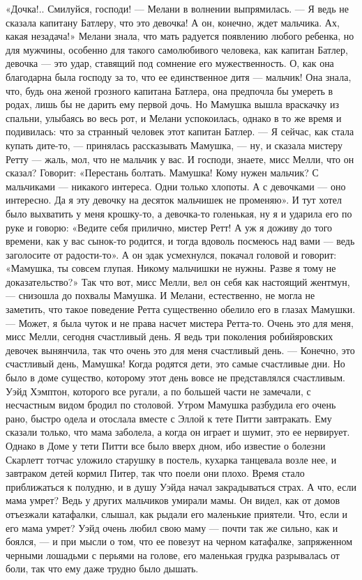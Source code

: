 «Дочка!.. Смилуйся, господи! — Мелани в волнении выпрямилась. — Я ведь не сказала капитану Батлеру, что это девочка! А он, конечно, ждет мальчика. Ах, какая незадача!» Мелани знала, что мать радуется появлению любого ребенка, но для мужчины, особенно для такого самолюбивого человека, как капитан Батлер, девочка — это удар, ставящий под сомнение его мужественность. О, как она благодарна была господу за то, что ее единственное дитя — мальчик! Она знала, что, будь она женой грозного капитана Батлера, она предпочла бы умереть в родах, лишь бы не дарить ему первой дочь.
Но Мамушка вышла враскачку из спальни, улыбаясь во весь рот, и Мелани успокоилась, однако в то же время и подивилась: что за странный человек этот капитан Батлер.
— Я сейчас, как стала купать дите-то, — принялась рассказывать Мамушка, — ну, и сказала мистеру Ретту — жаль, мол, что не мальчик у вас. И господи, знаете, мисс Мелли, что он сказал? Говорит: «Перестань болтать. Мамушка! Кому нужен мальчик? С мальчиками — никакого интереса. Одни только хлопоты. А с девочками — оно интересно. Да я эту девочку на десяток мальчишек не променяю». И тут хотел было выхватить у меня крошку-то, а девочка-то голенькая, ну я и ударила его по руке и говорю: «Ведите себя прилично, мистер Ретт! А уж я доживу до того времени, как у вас сынок-то родится, и тогда вдоволь посмеюсь над вами — ведь заголосите от радости-то». А он эдак усмехнулся, покачал головой и говорит: «Мамушка, ты совсем глупая. Никому мальчишки не нужны. Разве я тому не доказательство?» Так что вот, мисс Мелли, вел он себя как настоящий жентмун, — снизошла до похвалы Мамушка.
И Мелани, естественно, не могла не заметить, что такое поведение Ретта существенно обелило его в глазах Мамушки.
— Может, я была чуток и не права насчет мистера Ретта-то. Очень это для меня, мисс Мелли, сегодня счастливый день. Я ведь три поколения робийяровских девочек вынянчила, так что очень это для меня счастливый день.
— Конечно, это счастливый день, Мамушка! Когда родятся дети, это самые счастливые дни.
Но было в доме существо, которому этот день вовсе не представлялся счастливым. Уэйд Хэмптон, которого все ругали, а по большей части не замечали, с несчастным видом бродил по столовой. Утром Мамушка разбудила его очень рано, быстро одела и отослала вместе с Эллой к тете Питти завтракать. Ему сказали только, что мама заболела, а когда он играет и шумит, это ее нервирует. Однако в Доме у тети Питти все было вверх дном, ибо известие о болезни Скарлетт тотчас уложило старушку в постель, кухарка танцевала возле нее, и завтраком детей кормил Питер, так что поели они плохо. Время стало приближаться к полудню, и в душу Уэйда начал закрадываться страх. А что, если мама умрет? Ведь у других мальчиков умирали мамы. Он видел, как от домов отъезжали катафалки, слышал, как рыдали его маленькие приятели. Что, если и его мама умрет? Уэйд очень любил свою маму — почти так же сильно, как и боялся, — и при мысли о том, что ее повезут на черном катафалке, запряженном черными лошадьми с перьями на голове, его маленькая грудка разрывалась от боли, так что ему даже трудно было дышать.
